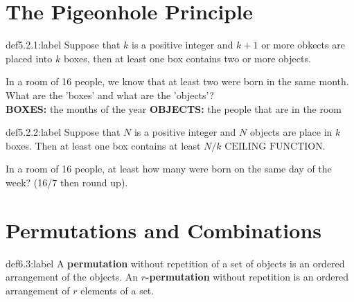 \section{The Pigeonhole Principle}

\begin{definition}{def5.2.1:label}
    Suppose that $k$ is a positive integer and $k+1$ or more obkects are placed into $k$ boxes, then at least one box contains two or more objects.
\end{definition}

\begin{problem}
    In a room of 16 people, we know that at least two were born in the same month. What are the 'boxes' and what are the 'objects'?\\

    \textbf{BOXES:} the months of the year
    \textbf{OBJECTS:} the people that are in the room
\end{problem}


\begin{definition}{def5.2.2:label}
    Suppose that $N$ is a positive integer and $N$ objects are place in $k$ boxes. Then at least one box contains at least $N/k \text{ CEILING FUNCTION}$.
\end{definition}


\begin{problem}
    In a room of 16 people, at least how many were born on the same day of the week? (16/7 then round up).
\end{problem}



\section{Permutations and Combinations}

\begin{definition}{def6.3:label}
    A \textbf{permutation} without repetition of a set of objects is an ordered arrangement of the objects. An \textbf{$r$-permutation} without repetition is an ordered arrangement of $r$ elements of a set. 
\end{definition}


